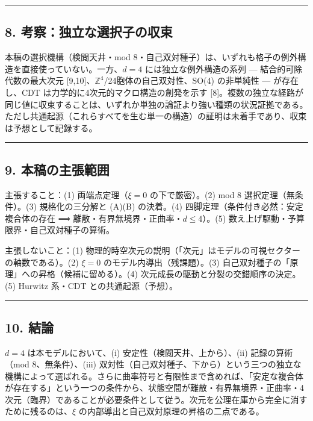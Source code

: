 \documentclass[
]{ltjsarticle}
\begin{document}
\begin{center}\rule{0.5\linewidth}{0.5pt}\end{center}

\subsection{8.
考察：独立な選択子の収束}\label{ux8003ux5bdfux72ecux7acbux306aux9078ux629eux5b50ux306eux53ceux675f}

本稿の選択機構（検閲天井・mod
8・自己双対種子）は、いずれも格子の例外構造を直接使っていない。一方、\(d=4\)
には独立な例外構造の系列 --- 結合的可除代数の最大次元
{[}9,10{]}、\(\mathbb{Z}^4\)/24胞体の自己双対性、SO(4) の非単純性 ---
が存在し、CDT は力学的に4次元的マクロ構造の創発を示す
{[}8{]}。複数の独立な経路が同じ値に収束することは、いずれか単独の論証より強い種類の状況証拠である。ただし共通起源（これらすべてを生む単一の構造）の証明は未着手であり、収束は予想として記録する。

\begin{center}\rule{0.5\linewidth}{0.5pt}\end{center}

\subsection{9.
本稿の主張範囲}\label{ux672cux7a3fux306eux4e3bux5f35ux7bc4ux56f2}

主張すること：(1) 両端点定理（\(\xi=0\) の下で厳密）。(2) mod 8
選択定理（無条件）。(3) 規格化の三分解と (A)(B) の決着。(4)
四脚定理（条件付き必然：安定複合体の存在 ⟹
離散・有界無境界・正曲率・\(d\le4\)）。(5)
数え上げ駆動・予算限界・自己双対種子の算術。

主張しないこと：(1)
物理的時空次元の説明（「次元」はモデルの可視セクターの軸数である）。(2)
\(\xi=0\) のモデル内導出（残課題）。(3)
自己双対種子の「原理」への昇格（候補に留める）。(4)
次元成長の駆動と分裂の交錯順序の決定。(5) Hurwitz 系・CDT
との共通起源（予想）。

\begin{center}\rule{0.5\linewidth}{0.5pt}\end{center}

\subsection{10. 結論}\label{ux7d50ux8ad6}

\(d=4\) は本モデルにおいて、(i) 安定性（検閲天井、上から）、(ii)
記録の算術（mod 8、無条件）、(iii)
双対性（自己双対種子、下から）という三つの独立な機構によって選ばれる。さらに曲率符号と有限性まで含めれば、「安定な複合体が存在する」という一つの条件から、状態空間が離散・有界無境界・正曲率・4次元（臨界）であることが必要条件として従う。次元を公理在庫から完全に消すために残るのは、\(\xi\)
の内部導出と自己双対原理の昇格の二点である。
\end{document}
